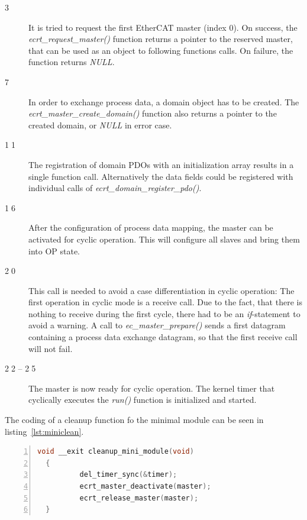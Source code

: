 \documentclass[a4paper,12pt,BCOR6mm,bibtotoc,idxtotoc]{scrbook}
\begin{document}
\begin{description}
\item[\normalfont\textcircled{\tiny 3}] It is tried to request the
  first EtherCAT master (index 0). On success, the
  \textit{ecrt\_\-request\_\-master()} function returns a pointer to
  the reserved master, that can be used as an object to following
  functions calls. On failure, the function returns \textit{NULL}.
\item[\normalfont\textcircled{\tiny 7}] In order to exchange process
  data, a domain object has to be created. The
  \textit{ecrt\_\-master\_\-create\_domain()} function also returns a
  pointer to the created domain, or \textit{NULL} in error case.
\item[\normalfont\textcircled{\tiny 11}] The registration of domain
  PDOs with an initialization array results in a single function call.
  Alternatively the data fields could be registered with individual
  calls of \textit{ecrt\_domain\_register\_pdo()}.
\item[\normalfont\textcircled{\tiny 16}] After the configuration of
  process data mapping, the master can be activated for cyclic
  operation. This will configure all slaves and bring them into
  OP state.
\item[\normalfont\textcircled{\tiny 20}] This call is needed to avoid
  a case differentiation in cyclic operation: The first operation in
  cyclic mode is a receive call. Due to the fact, that there is
  nothing to receive during the first cycle, there had to be an
  \textit{if}-statement to avoid a warning. A call to
  \textit{ec\_master\_prepare()} sends a first datagram containing a
  process data exchange datagram, so that the first receive call will
  not fail.
\item[\normalfont\textcircled{\tiny 22} -- \textcircled{\tiny 25}] The
  master is now ready for cyclic operation. The kernel timer that
  cyclically executes the \textit{run()} function is initialized and
  started.
\end{description}

The coding of a cleanup function fo the minimal module can be seen in
listing~\ref{lst:miniclean}.

\begin{lstlisting}[language=C,numbers=left,caption={Minimal cleanup
    function},label={lst:miniclean}]
  void __exit cleanup_mini_module(void)
  {
          del_timer_sync(&timer);
          ecrt_master_deactivate(master);
          ecrt_release_master(master);
  }
\end{lstlisting}
\end{document}
